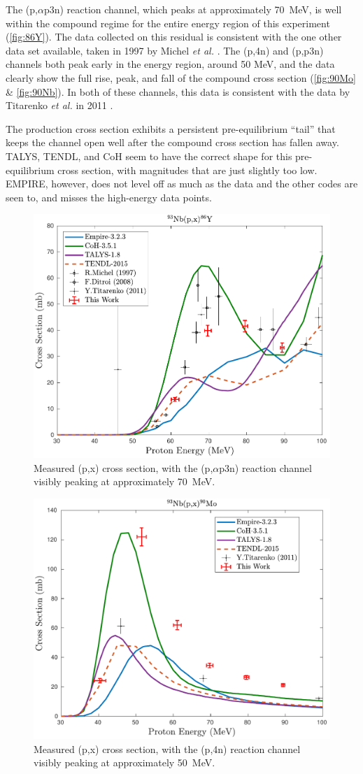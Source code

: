 The (p,$\alpha$p3n) reaction channel, which peaks at approximately \mbox{70 MeV}, is well within the compound regime for the entire energy region of this experiment (\autoref{fig:86Y}).
The data collected on this residual is consistent with the one other data set available, taken in 1997 by Michel \emph{et al.} \cite{MICHEL1997153}. 
The (p,4n) and (p,p3n) channels both peak early in the energy region, around 50 MeV, and the data clearly show the full rise, peak, and fall of the compound cross section (\autoref{fig:90Mo} \& \ref{fig:90Nb}). 
In both of these channels, this data  is consistent with the data by Titarenko \emph{et al.} in 2011 \cite{Titarenko2011}.

The  production cross section exhibits a persistent pre-equilibrium \enquote{tail} that keeps the channel open  well after the compound cross section has fallen away. 
TALYS, TENDL, and CoH seem to have the correct shape for this pre-equilibrium cross section, with magnitudes that are just slightly too low.
EMPIRE, however, does not level off  as much as the data and the other codes are seen to, and misses the high-energy data points.

\begin{figure}
 \centering
 \includegraphics[width=0.5\linewidth]{./figures/86Y.pdf}
 \caption{Measured (p,x) cross section, with the (p,$\alpha$p3n) reaction channel visibly peaking at approximately \mbox{70 MeV}.}
 \label{fig:86Y}
\end{figure}




\begin{figure}
 \centering
 \includegraphics[width=0.5\linewidth]{./figures/90Mo.pdf}
 \caption{Measured (p,x) cross section, with the (p,4n) reaction channel visibly peaking at approximately \mbox{50 MeV}.}
 \label{fig:90Mo}
\end{figure}


